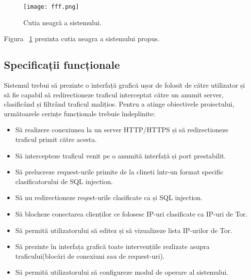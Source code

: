 \begin{figure}[h]
	\centering
	\texttt{[image: fff.png]}
	\caption{ Cutia neagră a sistemului.}
	\label{fig:black-box}
\end{figure}

Figura ~\ref{fig:black-box} prezinta cutia neagra a sistemului propus. \\

 \subsection{Specificații funcționale}

Sistemul trebui să prezinte o interfață grafică ușor de folosit de către utilizator și să fie capabil să redirectioneze traficul interceptat către un anumit server, clasificând și filtrând traficul malițios. Pentru a atinge obiectivele proiectului, următoarele cerințe funcționale trebuie îndeplinite: 
\begin{itemize}
  \item  Să realizere conexiunea la un server HTTP/HTTPS și să redirectioneze traficul primit către acesta. 
  \item  Să intercepteze traficul venit pe o anumită interfață și port prestabilit. 
  \item  Să prelucreze request-urile primite de la clineti într-un format specific clasificatorului de SQL injection. 
  \item  Să nu redirectioneze reqest-urile clasificate ca și SQL injection. 
  \item  Să blocheze conectarea clienților ce folosesc IP-uri clasificate ca IP-uri de Tor. 
  \item  Să permită utilizatorului să editez și să vizualizeze lista IP-urilor de Tor. 
  \item  Să prezinte în interfața grafică toate intervențiile rezlizate asupra traficului(blocări de conexiuni sau de request-uri). 
  \item  Să permită utilizatorului să configureze modul de operare al sistemului. 
\end{itemize}


